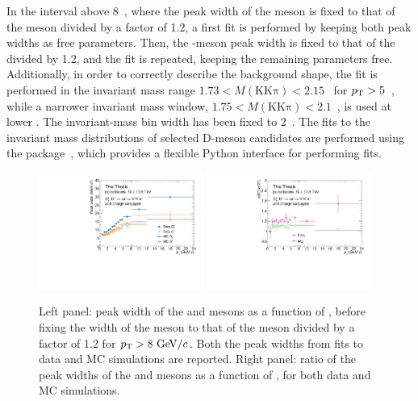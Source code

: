 In the \pt interval above 8~\gevc, where the peak width of the \dpl meson is fixed to that of the \ds meson divided by a factor of 1.2, a first fit is performed by keeping both peak widths as free parameters. Then, the \dpl-meson peak width is fixed to that of the \ds divided by 1.2, and the fit is repeated, keeping the remaining parameters free. Additionally, in order to correctly describe the background shape, the fit is performed in the invariant mass range \mbox{$1.73<M(\mathrm{KK\pi})<2.15$~\gevcc} for \mbox{$p_\mathrm{T}>5$~\gevc}, while a narrower invariant mass window, \mbox{$1.75<M(\mathrm{KK\pi})<2.1$~\gevcc}, is used at lower \pt. The invariant-mass bin width has been fixed to 2~\mevcc. The fits to the invariant mass distributions of selected D-meson candidates are performed using the  package~\cite{grosa_2023_7579657}, which provides a flexible Python interface for performing fits. 

\begin{figure}[htb]
    \centering
    \includegraphics[width=0.48\textwidth]{Figures/Chapter 5/SigmaDs_Dplus.pdf}
    \includegraphics[width=0.48\textwidth]{Figures/Chapter 5/SigmaDsOverDplusMC.pdf}
    \caption{Left panel: peak width of the \ds and \dpl mesons as a function of \pt, before fixing the width of the \dpl meson to that of the \ds meson divided by a factor of 1.2 for $p_\mathrm{T}>8~\mathrm{Ge\kern-.1emV}/c$. Both the peak widths from fits to data and MC simulations are reported. Right panel: ratio of the peak widths of the \ds and \dpl mesons as a function of \pt, for both data and MC simulations.}
    \label{fig:sigma_ratio}
\end{figure}


